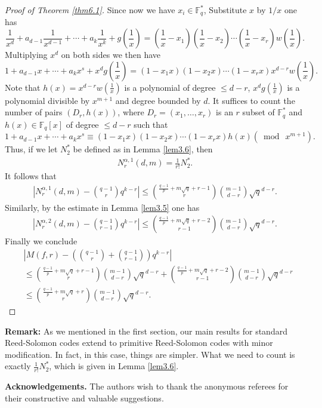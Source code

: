 \documentclass[reqno]{amsart}
\theoremstyle{remark}
\numberwithin{equation}{section}
\newcommand{\f}{\mathbb{F}_q}
\begin{document}
\begin{proof}[Proof of Theorem \ref{thm6.1}]
Since now we have $x_i\in \f^*$, Substitute $x$ by $1/x$ one has
\[ \frac 1 {x^d}+a_{d-1}\frac 1 {x^{d-1}}+\cdots+a_{k}\frac 1 {x^{k}}+g(\frac 1 x)=(\frac 1 x-x_1)(\frac 1 x -x_2)\cdots(\frac 1 x-x_r)w(\frac 1x).\]
Multiplying $x^d$ on both sides we then have
$$ 1+a_{d-1}x+\cdots+a_{k}x^s+x^d g(\frac 1 x)=(1-x_1 x)(1-x_2 x)\cdots(1-x_r x)x^{d-r}w(\frac 1x ).$$
Note that $h(x)=x^{d-r}w(\frac 1x )$ is a polynomial of degree $\leq d-r$,  $x^{d}g(\frac 1x )$ is a polynomial divisible by $x^{m+1}$ and degree bounded by $d$.
It suffices to count the number of pairs $(D_r, h(x))$, where $D_r=(x_1,\ldots, x_r)$  is an $r$ subset of $\f^*$ and $h(x)\in \f [x] $ of degree $\leq d-r$ such that
$$1+a_{d-1}x+\cdots+a_{k}x^s\equiv(1-x_1 x)(1-x_2 x)\cdots(1-x_r x)h(x) (\bmod \ x^{m+1}).$$
Thus, if we let $N_2^*$ be defined as in  Lemma \ref{lem3.6}, then
\begin{align*}
N_r^{\alpha, 1}(d, m)=\frac {1}{r!}N_2^*.
\end{align*}
It follows that
 \begin{align*}
\left| N_r^{\alpha,1}(d, m)-{q-1 \choose r}q^{k-r} \right| \leq  {\frac {q-1}p+m\sqrt{q}+r-1 \choose r}{m-1 \choose d-r} \sqrt{q}^{d-r}.
 \end{align*}
 Similarly, by the estimate in Lemma \ref{lem3.5} one has
 \begin{align*}
\left| N_r^{\alpha,2}(d, m)-{q-1 \choose r-1}q^{k-r} \right| \leq  {\frac {q-1}p+m\sqrt{q}+r-2 \choose r-1}{m-1 \choose d-r} \sqrt{q}^{d-r}.
 \end{align*}
Finally we conclude
  \begin{align*}
&\left| M(f,r)-\left({q-1 \choose r}+{q-1 \choose r-1}\right)q^{k-r} \right| \\
&\leq   {\frac {q-1}p+m\sqrt{q}+r-1 \choose r}{m-1 \choose d-r} \sqrt{q}^{d-r}+  {\frac {q-1}p+m\sqrt{q}+r-2 \choose r-1}{m-1 \choose d-r} \sqrt{q}^{d-r}\\
&\leq {\frac {q-1}p+m\sqrt{q}+r \choose r}{m-1 \choose d-r} \sqrt{q}^{d-r}.
 \end{align*}
 \end{proof}

{ \bf Remark:}  As we mentioned in the first section,  our main results for standard Reed-Solomon codes extend to primitive Reed-Solomon codes with minor modification. In fact, in this case, things are simpler. What we need to count is exactly $\frac 1 {r!}N_2^*$, which is given in Lemma \ref{lem3.6}.

{\bf Acknowledgements.} The authors wish to thank the anonymous
 referees for their constructive and valuable suggestions.


 

\end{document}
